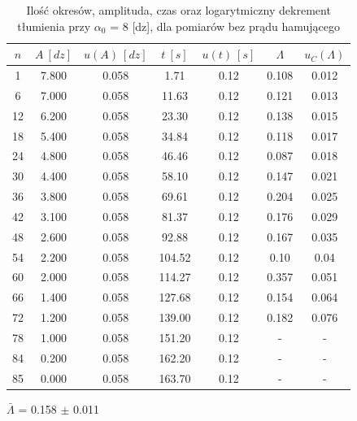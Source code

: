 \documentclass[12pt, a4paper, oneside]{article}
\begin{document}
\begin{table}[h]
  \centering
  \caption{Ilość okresów, amplituda, czas oraz logarytmiczny dekrement tłumienia przy $\alpha_0$ = 8 [dz], dla pomiarów bez prądu hamującego}
    \begin{tabular}{|c|c|c|c|c|c|c|}\hline
    $n$ & $A~[dz]$ & $u(A)~[dz]$ & $t~[s]$ & \multicolumn{1}{c|}{$u(t)~[s]$} & $\Lambda$ & \multicolumn{1}{c|}{$u_C(\Lambda)$} \\\hline
    1 & 7.800 & 0.058 & 1.71 & 0.12 & 0.108 & \multicolumn{1}{c|}{0.012} \\\hline
    6 & 7.000 & 0.058 & 11.63 & 0.12 & 0.121 & \multicolumn{1}{c|}{0.013} \\\hline
    12 & 6.200 & 0.058 & 23.30 & 0.12 & 0.138 & \multicolumn{1}{c|}{0.015} \\\hline
    18 & 5.400 & 0.058 & 34.84 & 0.12 & 0.118 & \multicolumn{1}{c|}{0.017} \\\hline
    24 & 4.800 & 0.058 & 46.46 & 0.12 & 0.087 & \multicolumn{1}{c|}{0.018} \\\hline
    30 & 4.400 & 0.058 & 58.10 & 0.12 & 0.147 & \multicolumn{1}{c|}{0.021} \\\hline
    36 & 3.800 & 0.058 & 69.61 & 0.12 & 0.204 & \multicolumn{1}{c|}{0.025} \\\hline
    42 & 3.100 & 0.058 & 81.37 & 0.12 & 0.176 & \multicolumn{1}{c|}{0.029} \\\hline
    48 & 2.600 & 0.058 & 92.88 & 0.12 & 0.167 & \multicolumn{1}{c|}{0.035} \\\hline
    54 & 2.200 & 0.058 & 104.52 & 0.12 & 0.10 & \multicolumn{1}{c|}{0.04} \\\hline
    60 & 2.000 & 0.058 & 114.27 & 0.12 & 0.357 & \multicolumn{1}{c|}{0.051} \\\hline
    66 & 1.400 & 0.058 & 127.68 & 0.12 & 0.154 & \multicolumn{1}{c|}{0.064} \\\hline
    72 & 1.200 & 0.058 & 139.00 & 0.12 & 0.182 & \multicolumn{1}{c|}{0.076} \\\hline
    78 & 1.000 & 0.058 & 151.20 & 0.12 & - & - \\\hline
    84 & 0.200 & 0.058 & 162.20 & 0.12 & - & - \\\hline
    85 & 0.000 & 0.058 & 163.70 & 0.12 & - & - \\\hline
    \end{tabular}%
  \label{tab:addlabel}%
\end{table}%
\begin{center}
$\bar{\Lambda}$ = 0.158 $\pm$ 0.011
\end{center}
\end{document}
